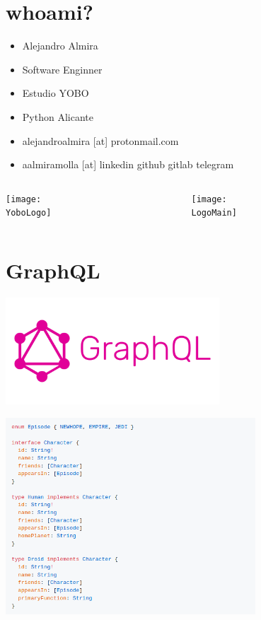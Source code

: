\documentclass[14pt]{beamer}
\newcommand{\LogoMain}{logo-python.png}
\newcommand{\YoboLogo}{yobo.png}
\begin{document}
\section{whoami?}
\begin{frame}
      \begin{itemize}
        \item Alejandro Almira
        \item Software Enginner %
        \item Estudio YOBO
        \item Python Alicante
        \item alejandroalmira [at] protonmail.com
        \item aalmiramolla [at] linkedin github gitlab telegram
      \end{itemize}
   \begin{columns}
     \begin{column}{0.5\textwidth}
          \texttt{[image: \\YoboLogo]}
     \end{column}
     \begin{column}{0.5\textwidth}  %
          \texttt{[image: \\LogoMain]}
     \end{column}
     \end{columns}
\end{frame}

\section{GraphQL}
\begin{frame}
  \begin{center}
    \includegraphics[width=0.6\textwidth]{graphql.png}
  \end{center}
\end{frame}
\begin{frame}
  \begin{center}
    \includegraphics[width=0.7\textwidth]{schema.png}
  \end{center}
\end{frame}
\end{document}
